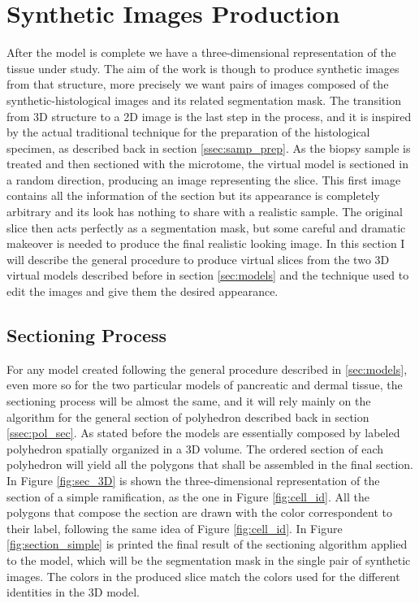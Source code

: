 \documentclass[12pt,a4paper]{report}
\begin{document}
        \section{Synthetic Images Production} \label{sec:synth_image}
    After the model is complete we have a three-dimensional representation of the tissue under study. The aim of the work is though to produce synthetic images from that structure, more precisely we want pairs of images composed of the synthetic-histological images and its related segmentation mask. The transition from 3D structure to a 2D image is the last step in the process, and it is inspired by the actual traditional technique for the preparation of the histological specimen, as described back in section \ref{ssec:samp_prep}. As the biopsy sample is treated and then sectioned with the microtome, the virtual model is sectioned in a random direction, producing an image representing the slice. This first image contains all the information of the section but its appearance is completely arbitrary and its look has nothing to share with a realistic sample. The original slice then acts perfectly as a segmentation mask, but some careful and dramatic makeover is needed to produce the final realistic looking image. In this section I will describe the general procedure to produce virtual slices from the two 3D virtual models described before in section \ref{sec:models} and the technique used to edit the images and give them the desired appearance.

\subsection{Sectioning Process} \label{ssec:sect_proc}
    For any model created following the general procedure described in \ref{sec:models}, even more so for the two particular models of pancreatic and dermal tissue, the sectioning process will be almost the same, and it will rely mainly on the algorithm for the general section of polyhedron described back in section \ref{ssec:pol_sec}. As stated before the models are essentially composed by labeled polyhedron spatially organized in a 3D volume. The ordered section of each polyhedron will yield all the polygons that shall be assembled in the final section.
    In Figure \ref{fig:sec_3D} is shown the three-dimensional representation of the section of a simple ramification, as the one in Figure \ref{fig:cell_id}. All the polygons that compose the section are drawn with the color correspondent to their label, following the same idea of Figure \ref{fig:cell_id}. In Figure \ref{fig:section_simple} is printed the final result of the sectioning algorithm applied to the model, which will be the segmentation mask in the single pair of synthetic images. The colors in the produced slice match the colors used for the different identities in the 3D model.
\end{document}
